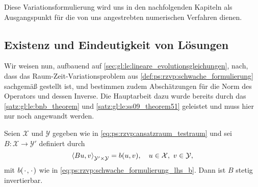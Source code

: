 Diese Variationsformulierung wird uns in den nachfolgenden Kapiteln als Ausgangspunkt für die von uns angestrebten numerischen Verfahren dienen.

\subsection{Existenz und Eindeutigkeit von Lösungen} %
\label{sub:ps:eel:existenz_und_eindeutigkeit_von_loesungen}

Wir weisen nun, aufbauend auf \cref{sec:gl:le:lineare_evolutionsgleichungen}, nach, dass das Raum-Zeit-Variationsproblem aus \cref{def:ps:rzvp:schwache_formulierung} sachgemäß gestellt ist, und bestimmen zudem Abschätzungen für die Norm des Operators und dessen Inverse.
Die Hauptarbeit dazu wurde bereits durch das \cref{satz:gl:le:bnb_theorem} und \cref{satz:gl:le:ss09_theorem51} geleistet und muss hier nur noch angewandt werden.


\begin{Korollar}
\label{kor:ps:eel:schwache_formulierung_sachgemaess_gestellt}
    Seien $\mathcal X$ und $\mathcal Y$ gegeben wie in \cref{eq:ps:rzvp:ansatzraum_testraum} und sei $B \colon \mathcal X \to \mathcal Y'$ definiert durch
    \begin{equation}
        \left\langle Bu,v\right\rangle_{\mathcal Y' \times \mathcal Y}  = b(u, v), \quad u \in \mathcal X,~ v \in \mathcal Y,
    \end{equation}
    mit $b({\mkern2mu\cdot\mkern2mu}, {\mkern2mu\cdot\mkern2mu})$ wie in \cref{eq:ps:rzvp:schwache_formulierung_lhs_b}.
    Dann ist $B$ stetig invertierbar.
\end{Korollar}

